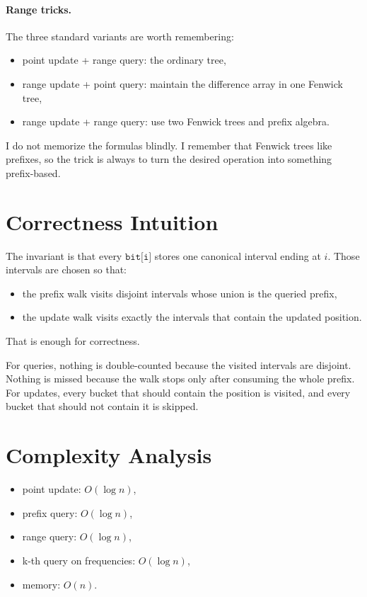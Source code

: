 \paragraph{Range tricks.}
The three standard variants are worth remembering:

\begin{itemize}
  \item point update + range query: the ordinary tree,
  \item range update + point query: maintain the difference array in one Fenwick tree,
  \item range update + range query: use two Fenwick trees and prefix algebra.
\end{itemize}

I do not memorize the formulas blindly. I remember that Fenwick trees like prefixes, so the trick is always to turn
the desired operation into something prefix-based.

\section*{Correctness Intuition}

The invariant is that every \(\texttt{bit[i]}\) stores one canonical interval ending at \(i\). Those intervals are
chosen so that:

\begin{itemize}
  \item the prefix walk visits disjoint intervals whose union is the queried prefix,
  \item the update walk visits exactly the intervals that contain the updated position.
\end{itemize}

That is enough for correctness.

For queries, nothing is double-counted because the visited intervals are disjoint. Nothing is missed because the walk
stops only after consuming the whole prefix. For updates, every bucket that should contain the position is visited, and
every bucket that should not contain it is skipped.

\section*{Complexity Analysis}

\begin{itemize}
  \item point update: \(O(\log n)\),
  \item prefix query: \(O(\log n)\),
  \item range query: \(O(\log n)\),
  \item k-th query on frequencies: \(O(\log n)\),
  \item memory: \(O(n)\).
\end{itemize}

